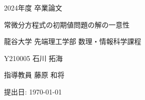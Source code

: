 \documentclass{beamer}
\begin{document}
\begin{frame}{2024年度 卒業論文}
  \begin{center}
    \Large{常微分方程式の初期値問題の解の一意性}
    
    \vspace{1em}
    \normalsize{龍谷大学 先端理工学部 数理・情報科学課程}
    
    \vspace{1em}
    \normalsize{Y210005 石川 拓海}
    
    \vspace{1em}
    \normalsize{指導教員 藤原 和将}

    \vspace{1em}
    \normalsize{提出日: \today}
  \end{center}
\end{frame}
\end{document}
